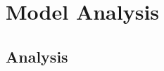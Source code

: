 \chapter{Model Analysis}
\label{cha:model_analysis}
% 
\section{Analysis}
% 
\begin{figure}[!tb]
\centering
{}
\caption{}
\end{figure}

